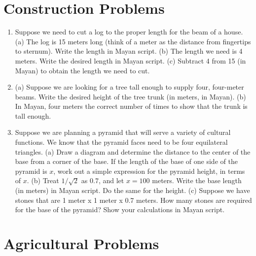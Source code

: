 \documentclass[12pt]{article}
\begin{document}
\clearpage

\section{Construction Problems}

\begin{enumerate}
\item Suppose we need to cut a log to the proper length for the beam of a house.  (a) The log is 15 meters long (think of a meter as the distance from fingertips to sternum).  Write the length in Mayan script.  (b) The length we need is 4 meters.  Write the desired length in Mayan script.  (c) Subtract 4 from 15 (in Mayan) to obtain the length we need to cut. \\ \vspace{3.5cm}
\item (a) Suppose we are looking for a tree tall enough to supply four, four-meter beams.  Write the desired height of the tree trunk (in meters, in Mayan). (b) In Mayan, four meters the correct number of times to show that the trunk is tall enough. \\ \vspace{3.5cm}
\item Suppose we are planning a pyramid that will serve a variety of cultural functions.  We know that the pyramid faces need to be four equilateral triangles. (a) Draw a diagram and determine the distance to the center of the base from a corner of the base.  If the length of the base of one side of the pyramid is $x$, work out a simple expression for the pyramid height, in terms of $x$.  (b) Treat $1/\sqrt{2}$ as 0.7, and let $x = 100$ meters.  Write the base length (in meters) in Mayan script.  Do the same for the height. (c) Suppose we have stones that are 1 meter x 1 meter x 0.7 meters.  How many stones are required for the base of the pyramid?  Show your calculations in Mayan script. \\ \vspace{7cm}
\end{enumerate}

\section{Agricultural Problems}
\end{document}
